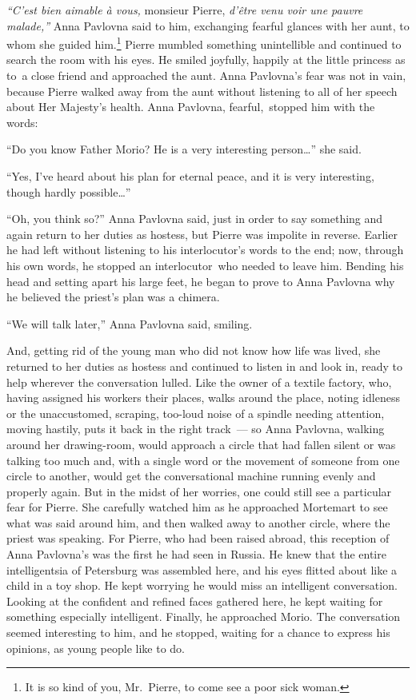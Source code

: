\textit{``C'est bien aimable \`a vous,} monsieur Pierre,
\textit{d'\^etre venu voir une pauvre malade,''} Anna Pavlovna said to
him, exchanging fearful glances with her aunt, to whom she guided
him.\footnote{It is so kind of you, Mr.~Pierre, to come see a poor
  sick woman.} Pierre mumbled something unintellible and continued to
search the room with his eyes. He smiled joyfully, happily at the
little princess as to\ a close friend and approached the
aunt. Anna Pavlovna's fear was not in vain, because Pierre walked away
from the aunt without listening to all of her speech about Her
Majesty's health. Anna Pavlovna, fearful,\ stopped him
with the words:

  ``Do you know Father Morio? He is a very interesting person\ldots{}''
  she said.

``Yes, I've heard about his plan for eternal peace, and it is very
interesting, though hardly possible\ldots{}''

``Oh, you think so?'' Anna Pavlovna said, just in order to say
something and again return to her duties as hostess, but Pierre was
impolite in reverse. Earlier he had left without listening to his
interlocutor's words to the end; now, through his own words, he
stopped an interlocutor\ who needed to leave
him. Bending his head and setting apart his large feet, he began to
prove to Anna Pavlovna why he believed the priest's plan was a chimera.

``We will talk later,'' Anna Pavlovna said, smiling.

And, getting rid of the young man who did not know how life was lived,
she returned to her duties as hostess and continued to listen in and
look in, ready to help wherever the conversation lulled. Like the
owner of a textile factory, who, having assigned his workers their
places, walks around the place, noting idleness or the unaccustomed,
scraping, too-loud noise of a spindle needing attention, moving
hastily, puts it back in the right track\ --- so Anna
Pavlovna, walking around her drawing-room, would approach a circle
that had fallen silent or was talking too much and, with a single word
or the movement of someone from one circle to another, would get the
conversational machine running evenly and properly again. But in the
midst of her worries, one could still see a particular fear for
Pierre. She carefully watched him as he approached Mortemart to see
what was said around him, and then walked away to another circle,
where the priest was speaking. For Pierre, who had been raised abroad,
this reception of Anna Pavlovna's was the first he had seen in
Russia. He knew that the entire intelligentsia of Petersburg was
assembled here, and his eyes flitted about like a child in a toy
shop. He kept worrying he would miss an intelligent
conversation. Looking at the confident and refined faces gathered
here, he kept waiting for something especially intelligent. Finally,
he approached Morio. The conversation seemed interesting to him, and
he stopped, waiting for a chance to express his opinions, as young
people like to do.

